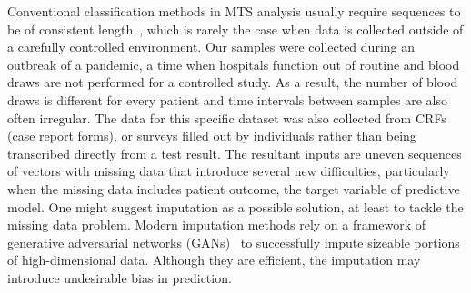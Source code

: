 Conventional classification methods in MTS analysis usually require sequences to be of consistent length~\cite{lu2018predicting}, which is rarely the case when data is collected outside of a carefully controlled environment. Our samples were collected during an outbreak of a pandemic, a time when hospitals function out of routine and blood draws are not performed for a controlled study. As a result, the number of blood draws is different for every patient and time intervals between samples are also often irregular. The data for this specific dataset was also collected from CRFs (case report forms), or surveys filled out by individuals rather than being transcribed directly from a test result. The resultant inputs are uneven sequences of vectors with missing data that introduce several new difficulties, particularly when the missing data includes patient outcome, the target variable of predictive model. One might suggest imputation as a possible solution, at least to tackle the missing data problem. Modern imputation methods rely on a framework of generative adversarial networks (GANs)~\cite{yoon2018gain} to successfully impute sizeable portions of high-dimensional data. Although they are efficient, the imputation may introduce undesirable bias in prediction.

